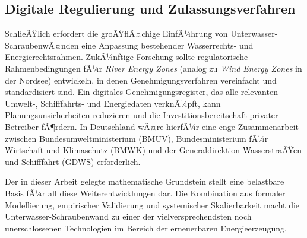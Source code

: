 ﻿\documentclass[a4paper,12pt]{article}
\theoremstyle{definition}
\begin{document}
\subsection{Digitale Regulierung und Zulassungsverfahren}

SchlieÃŸlich erfordert die groÃŸflÃ¤chige EinfÃ¼hrung von Unterwasser-SchraubenwÃ¤nden
eine Anpassung bestehender Wasserrechts- und Energierechtsrahmen. ZukÃ¼nftige
Forschung sollte regulatorische Rahmenbedingungen fÃ¼r \emph{River Energy Zones}
(analog zu \emph{Wind Energy Zones} in der Nordsee) entwickeln, in denen
Genehmigungsverfahren vereinfacht und standardisiert sind. Ein digitales
Genehmigungsregister, das alle relevanten Umwelt-, Schifffahrts- und
Energiedaten verknÃ¼pft, kann Planungsunsicherheiten reduzieren und die
Investitionsbereitschaft privater Betreiber fÃ¶rdern. In Deutschland wÃ¤re
hierfÃ¼r eine enge Zusammenarbeit zwischen Bundesumweltministerium (BMUV),
Bundesministerium fÃ¼r Wirtschaft und Klimaschutz (BMWK) und der
Generaldirektion WasserstraÃŸen und Schifffahrt (GDWS) erforderlich.

\bigskip

\noindent Der in dieser Arbeit gelegte mathematische Grundstein stellt eine
belastbare Basis fÃ¼r all diese Weiterentwicklungen dar. Die Kombination aus
formaler Modellierung, empirischer Validierung und systemischer Skalierbarkeit
macht die Unterwasser-Schraubenwand zu einer der vielversprechendsten noch
unerschlossenen Technologien im Bereich der erneuerbaren Energieerzeugung.
\end{document}
